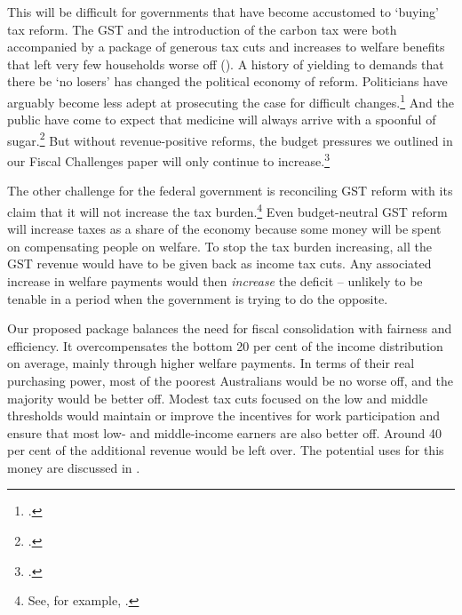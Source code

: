 \documentclass{grattanAlpha}
\begin{document}
This will be difficult for governments that have become accustomed to ‘buying’ tax reform. The GST and the introduction of the carbon tax were both accompanied by a package of generous tax cuts and increases to welfare benefits that left very few households worse off (). A history of yielding to demands that there be ‘no losers’ has changed the political economy of reform. Politicians have arguably become less adept at prosecuting the case for difficult changes.\footcite[][80]{Megalogenis2010}  And the public have come to expect that medicine will always arrive with a spoonful of sugar.\footcites[][45]{Megalogenis2010}{Henry2015}   But without revenue-positive reforms, the budget pressures we outlined in our Fiscal Challenges paper will only continue to increase.\footcite{DaleyWood2015FiscalChallenges}   

The other challenge for the federal government is reconciling GST reform with its claim that it will not increase the tax burden.\footnote{See, for example, \textcite{Morrison2015-QnA-Melbourne-Institute}.}  Even budget-neutral GST reform will increase taxes as a share of the economy because some money will be spent on compensating people on welfare. To stop the tax burden increasing, all the GST revenue would have to be given back as income tax cuts. Any associated increase in welfare payments would then \emph{increase} the deficit – unlikely to be tenable in a period when the government is trying to do the opposite. 

Our proposed package balances the need for fiscal consolidation with fairness and efficiency. It overcompensates the bottom 20 per cent of the income distribution on average, mainly through higher welfare payments. In terms of their real purchasing power, most of the poorest Australians would be no worse off, and the majority would be better off. Modest tax cuts focused on the low and middle thresholds would maintain or improve the incentives for work participation and ensure that most low- and middle-income earners are also better off. Around 40 per cent of the additional revenue would be left over. The potential uses for this money are discussed in . 
\end{document}
